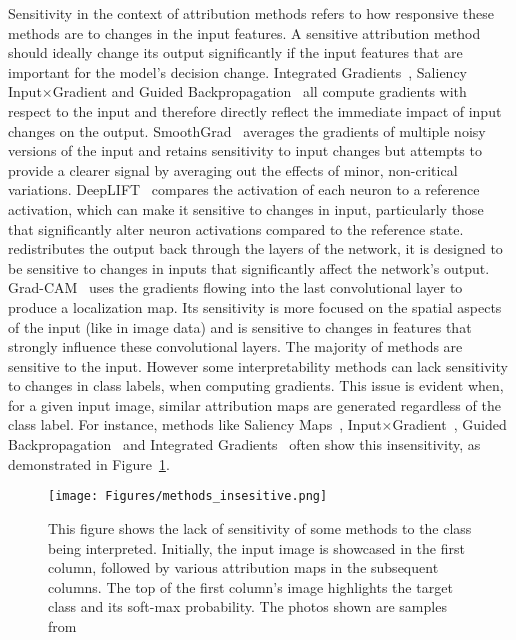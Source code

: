 Sensitivity in the context of attribution methods refers to how responsive these methods are to changes in the input features. A sensitive attribution method should ideally change its output significantly if the input features that are important for the model's decision change. Integrated Gradients~\cite{SundararajanTY17}, Saliency~\cite{SimonyanVZ13} Input$\times$Gradient\cite{SimonyanVZ13} and Guided Backpropagation~\cite{SpringenbergDBR14} all compute gradients with respect to the input and therefore directly reflect the immediate impact of input changes on the output. SmoothGrad~\cite{SmilkovTKVW17} averages the gradients of multiple noisy versions of the input and retains sensitivity to input changes but attempts to provide a clearer signal by averaging out the effects of minor, non-critical variations. DeepLIFT~\cite{ShrikumarGK17} compares the activation of each neuron to a reference activation, which can make it sensitive to changes in input, particularly those that significantly alter neuron activations compared to the reference state. \LRP~\cite{bach2015pixel} redistributes the output back through the layers of the network, it is designed to be sensitive to changes in inputs that significantly affect the network’s output. Grad-CAM~\cite{SelvarajuCDVPB20} uses the gradients flowing into the last convolutional layer to produce a localization map. Its sensitivity is more focused on the spatial aspects of the input (like in image data) and is sensitive to changes in features that strongly influence these convolutional layers. The majority of methods are sensitive to the input. However some interpretability methods can lack sensitivity to changes in class labels, when computing gradients. This issue is evident when, for a given input image, similar attribution maps are generated regardless of the class label. For instance, methods like Saliency Maps~\cite{SimonyanVZ13}, Input$\times$Gradient~\cite{SimonyanVZ13}, Guided Backpropagation~\cite{SpringenbergDBR14} and Integrated Gradients~\cite{SundararajanTY17} often show this insensitivity, as demonstrated in Figure~\ref{Fig:sensitivity}.


\begin{figure}[ht!]
	\begin{center}
		\texttt{[image: Figures/methods\_insesitive.png]}
	\end{center}
	\caption{This figure shows the lack of sensitivity of some methods to the class being interpreted. Initially, the input image is showcased in the first column, followed by various attribution maps in the subsequent columns. The top of the first column's image highlights the target class and its soft-max probability. The photos shown are samples from~\cite{NielsenDRRB22}}
	\label{Fig:sensitivity}
\end{figure} 

